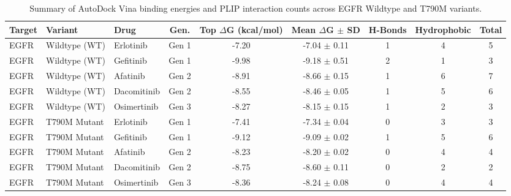 \begin{table}[htbp]
  \centering
  \caption{Summary of AutoDock Vina binding energies and PLIP interaction counts across EGFR Wildtype and T790M variants.}
  \label{tab:docking_plip_summary}
  \begin{tabular}{lllcS[table-format=-1.2]cSSS}
    \toprule
    \textbf{Target} & \textbf{Variant} & \textbf{Drug} & \textbf{Gen.} & {\textbf{Top $\Delta$G (kcal/mol)}} & {\textbf{Mean $\Delta$G $\pm$ SD}} & {\textbf{H-Bonds}} & {\textbf{Hydrophobic}} & {\textbf{Total}} \\
    \midrule
    EGFR & Wildtype (WT) & Erlotinib & Gen 1 & -7.20 & -7.04 $\pm$ 0.11 & 1 & 4 & 5 \\
    EGFR & Wildtype (WT) & Gefitinib & Gen 1 & -9.98 & -9.18 $\pm$ 0.51 & 2 & 1 & 3 \\
    EGFR & Wildtype (WT) & Afatinib & Gen 2 & -8.91 & -8.66 $\pm$ 0.15 & 1 & 6 & 7 \\
    EGFR & Wildtype (WT) & Dacomitinib & Gen 2 & -8.55 & -8.46 $\pm$ 0.05 & 1 & 5 & 6 \\
    EGFR & Wildtype (WT) & Osimertinib & Gen 3 & -8.27 & -8.15 $\pm$ 0.15 & 1 & 2 & 3 \\
    \midrule
    EGFR & T790M Mutant & Erlotinib & Gen 1 & -7.41 & -7.34 $\pm$ 0.04 & 0 & 3 & 3 \\
    EGFR & T790M Mutant & Gefitinib & Gen 1 & -9.12 & -9.09 $\pm$ 0.02 & 1 & 5 & 6 \\
    EGFR & T790M Mutant & Afatinib & Gen 2 & -8.23 & -8.20 $\pm$ 0.02 & 0 & 4 & 4 \\
    EGFR & T790M Mutant & Dacomitinib & Gen 2 & -8.75 & -8.60 $\pm$ 0.11 & 0 & 2 & 2 \\
    EGFR & T790M Mutant & Osimertinib & Gen 3 & -8.36 & -8.24 $\pm$ 0.08 & 0 & 4 & 4 \\
    \bottomrule
  \end{tabular}
\end{table}